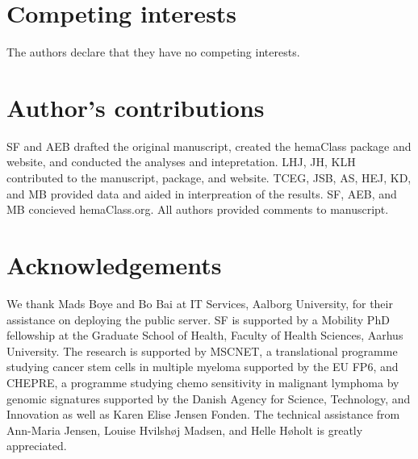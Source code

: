 \documentclass[twocolumn]{bmcart}%
\begin{document}
\begin{backmatter}

\section*{Competing interests}
The authors declare that they have no competing interests.

\section*{Author's contributions}
SF and AEB drafted the original manuscript, created the hemaClass package and website,
and conducted the analyses and intepretation.
LHJ, JH, KLH contributed to the manuscript, package, and website.
TCEG, JSB, AS, HEJ, KD, and MB provided data and aided in interpreation of the results.
SF, AEB, and MB concieved hemaClass.org.
All authors provided comments to manuscript.

\section*{Acknowledgements}
We thank Mads Boye and Bo Bai at IT Services, Aalborg University, for their assistance on deploying the public server.
SF is supported by a Mobility PhD fellowship at the Graduate School of Health, Faculty of Health Sciences, Aarhus University.
The research is supported by MSCNET, a translational programme studying cancer stem cells in multiple myeloma supported by the EU FP6, and CHEPRE, a programme studying chemo sensitivity in malignant lymphoma by genomic signatures supported by the Danish Agency for Science, Technology, and Innovation as well as Karen Elise Jensen Fonden.
The technical assistance from Ann-Maria Jensen, Louise Hvilsh{\o}j Madsen, and Helle H{\o}holt is greatly appreciated.



\end{backmatter}
\end{document}
